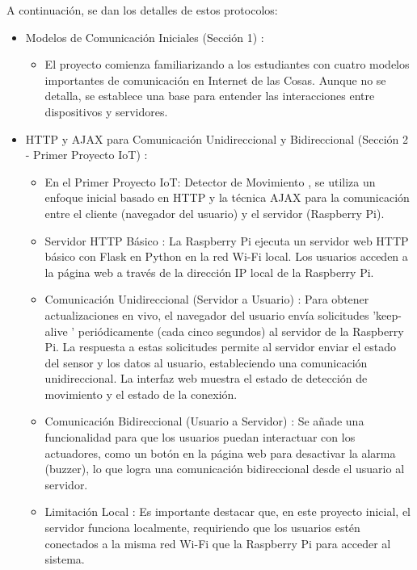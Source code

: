 \documentclass{report}
\begin{document}
A continuación, se dan los detalles de estos protocolos:
\begin{itemize}
    \item Modelos de Comunicación Iniciales (Sección 1) :
    \begin{itemize}
        \item El proyecto comienza familiarizando a los estudiantes con  cuatro modelos importantes de comunicación  en Internet de las Cosas. 
        Aunque no se  detalla, se establece una base para entender las interacciones entre dispositivos y servidores.
    \end{itemize}

    \item HTTP y AJAX para Comunicación Unidireccional y Bidireccional (Sección 2 - Primer Proyecto IoT) :
    \begin{itemize}
        \item En el  Primer Proyecto IoT: Detector de Movimiento , se utiliza un enfoque inicial basado en  HTTP  y la técnica  AJAX  para la comunicación 
        entre el cliente (navegador del usuario) y el servidor (Raspberry Pi).
        \item Servidor HTTP Básico : La Raspberry Pi ejecuta un servidor web HTTP básico con Flask en Python en la red Wi-Fi local. Los usuarios acceden 
        a la página web a través de la dirección IP local de la Raspberry Pi.
        \item Comunicación Unidireccional (Servidor a Usuario) : Para obtener actualizaciones en vivo, el navegador del usuario envía solicitudes 
        'keep-alive ' periódicamente (cada cinco segundos) al servidor de la Raspberry Pi. La respuesta a estas solicitudes permite al servidor enviar 
        el estado del sensor y los datos al usuario, estableciendo una comunicación unidireccional. La interfaz web muestra el estado de detección de 
        movimiento y el estado de la conexión.
        \item Comunicación Bidireccional (Usuario a Servidor) : Se añade una funcionalidad para que los usuarios puedan interactuar con los actuadores, 
        como un botón en la página web para desactivar la alarma (buzzer), lo que logra una comunicación bidireccional desde el usuario al servidor.
        \item Limitación Local : Es importante destacar que, en este proyecto inicial, el servidor funciona localmente, requiriendo que los usuarios 
        estén conectados a la misma red Wi-Fi que la Raspberry Pi para acceder al sistema.
    \end{itemize}


\end{itemize}
\end{document}
